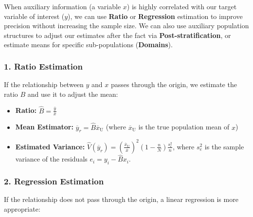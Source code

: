 \documentclass[
  letterpaper,
  DIV=11,
  numbers=noendperiod]{scrreprt}
\renewcommand{\[}{\begin{equation}}
\renewcommand{\]}{\end{equation}}
\begin{document}
\begin{tcolorbox}[enhanced jigsaw, arc=.35mm, bottomrule=.15mm, bottomtitle=1mm, breakable, colback=white, colbacktitle=quarto-callout-note-color!10!white, colframe=quarto-callout-note-color-frame, coltitle=black, left=2mm, leftrule=.75mm, opacityback=0, opacitybacktitle=0.6, rightrule=.15mm, title=\textcolor{quarto-callout-note-color}{\faInfo}\hspace{0.5em}{Key formulae}, titlerule=0mm, toprule=.15mm, toptitle=1mm]

When auxiliary information (a variable \(x\)) is highly correlated with
our target variable of interest (\(y\)), we can use \textbf{Ratio} or
\textbf{Regression} estimation to improve precision without increasing
the sample size. We can also use auxiliary population structures to
adjust our estimates after the fact via \textbf{Post-stratification}, or
estimate means for specific sub-populations (\textbf{Domains}).

\subsubsection*{1. Ratio Estimation}\label{ratio-estimation}

If the relationship between \(y\) and \(x\) passes through the origin,
we estimate the ratio \(B\) and use it to adjust the mean:

\begin{itemize}
\item
  \textbf{Ratio:} \(\hat{B} = \frac{\overline{y}}{\overline{x}}\)
\item
  \textbf{Mean Estimator:}
  \(\overline{y}_r = \hat{B} \overline{x}_{\text{U}}\) (where
  \(\overline{x}_{\text{U}}\) is the true population mean of \(x\))
\item
  \textbf{Estimated Variance:}
  \(\hat{V}(\overline{y}_r) = \left(\frac{\overline{x}_{\text{U}}}{\overline{x}}\right)^2 \left(1 - \frac{n}{N}\right) \frac{s_e^2}{n}\),
  where \(s_e^2\) is the sample variance of the residuals
  \(e_i = y_i - \hat{B}x_i\).
\end{itemize}

\subsubsection*{2. Regression Estimation}\label{regression-estimation}

If the relationship does not pass through the origin, a linear
regression is more appropriate:


\end{tcolorbox}
\end{document}
